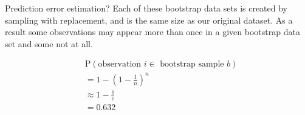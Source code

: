 \documentclass[14pt]{beamer}
\begin{document}
\begin{frame}[plain]{Prediction error estimation?}
%
Each of these bootstrap data sets is created by sampling with replacement, and is the same size as our original dataset. As a result some observations may appear more than once in a given bootstrap data set and some not at all.

\begin{align*}
	&\text{P}(\text{observation~} i \in \text{~bootstrap sample~} b) \\
	&= 1 - (1 - \frac1n)^n \\
	&\approx 1 - \frac1e \\
	&= 0.632
\end{align*}

\end{frame}
\end{document}
